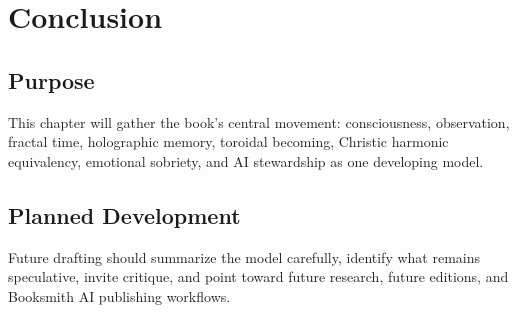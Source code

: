\chapter{Conclusion}

\section{Purpose}

This chapter will gather the book's central movement: consciousness, observation, fractal time, holographic memory, toroidal becoming, Christic harmonic equivalency, emotional sobriety, and AI stewardship as one developing model.

\section{Planned Development}

Future drafting should summarize the model carefully, identify what remains speculative, invite critique, and point toward future research, future editions, and Booksmith AI publishing workflows.
